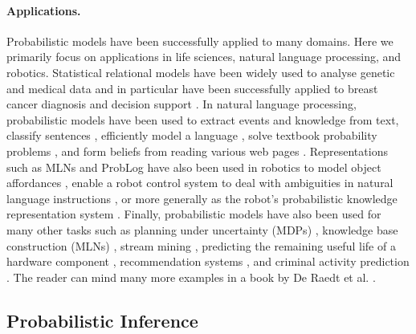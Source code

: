 \documentclass{article}
\begin{document}
\paragraph{Applications.}
Probabilistic models have been successfully applied to many domains. Here we
primarily focus on applications in life sciences, natural language processing,
and robotics. Statistical relational models have been widely used to analyse
genetic \cite{DBLP:journals/nar/MaeyerWRRM15,DBLP:journals/jcb/SakhanenkoG12}
and medical \cite{DBLP:conf/iaai/NatarajanKIJC13} data and in particular have
been successfully applied to breast cancer diagnosis and decision support
\cite{DBLP:conf/ilp/Corte-RealD017,DBLP:conf/pkdd/NassifKBPSC13}. In natural
language processing, probabilistic models have been used to extract events
\cite{DBLP:conf/emnlp/VenugopalCGN14} and knowledge
\cite{DBLP:conf/naacl/PoonV10} from text, classify sentences
\cite{DBLP:conf/emnlp/VerbekeAMFDR12}, efficiently model a language
\cite{DBLP:conf/icml/JerniteRS15}, solve textbook probability problems
\cite{DBLP:conf/ijcai/DriesKDBR17}, and form beliefs from reading various web
pages \cite{DBLP:conf/aaai/CarlsonBKSHM10}. Representations such as MLNs and
ProbLog have also been used in robotics to model object affordances
\cite{DBLP:conf/icra/MoldovanMOSR12,DBLP:conf/iros/MoldovanR14,DBLP:conf/ilp/MoldovanORMS11},
enable a robot control system to deal with ambiguities in natural language
instructions \cite{DBLP:journals/ras/BeetzJMT10}, or more generally as the
robot's probabilistic knowledge representation system
\cite{DBLP:conf/icra/JainMB09}. Finally, probabilistic models have also been
used for many other tasks such as planning under uncertainty (MDPs)
\cite{DBLP:journals/jair/BoutilierDH99}, knowledge base construction (MLNs)
\cite{DBLP:journals/ijswis/NiuZRS12}, stream mining
\cite{DBLP:conf/icdm/ChandraSKTA14}, predicting the remaining useful life of a
hardware component \cite{vlasselaer2012statistical}, recommendation systems
\cite{DBLP:journals/corr/YangKAGN16}, and criminal activity prediction
\cite{DBLP:conf/sdm/DelaneyFCWJ10}. The reader can mind many more examples in a
book by De Raedt et al. \cite{DBLP:series/synthesis/2016Raedt}.

\subsection{Probabilistic Inference} \label{sec:inference}
\end{document}
